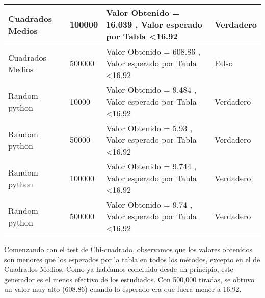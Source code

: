 \documentclass{article}
\begin{document}
\begin{table}[H]
\begin{tabular}{|l|l|l|l|}
\rowcolor[HTML]{FFFFFF} 
Cuadrados Medios                                                                        & 100000                                              & Valor Obtenido = 16.039  , Valor esperado por Tabla \textless 16.92                               & \cellcolor[HTML]{00FF00}Verdadero          \\ \hline
\rowcolor[HTML]{EFEFEF} 
Cuadrados Medios                                                                        & 500000                                              & Valor Obtenido = 608.86  , Valor esperado por Tabla \textless 16.92                               & \cellcolor[HTML]{FF0000}Falso              \\ \hline
\rowcolor[HTML]{FFFFFF} 
Random python                                                                           & 10000                                               & Valor Obtenido = 9.484  , Valor esperado por Tabla \textless 16.92                                & \cellcolor[HTML]{00FF00}Verdadero          \\ \hline
\rowcolor[HTML]{EFEFEF} 
Random python                                                                           & 50000                                               & Valor Obtenido = 5.93  , Valor esperado por Tabla \textless 16.92                                 & \cellcolor[HTML]{00FF00}Verdadero          \\ \hline
\rowcolor[HTML]{FFFFFF} 
Random python                                                                           & 100000                                              & Valor Obtenido = 9.744  , Valor esperado por Tabla \textless 16.92                                & \cellcolor[HTML]{00FF00}Verdadero          \\ \hline
\rowcolor[HTML]{EFEFEF} 
Random python                                                                           & 500000                                              & Valor Obtenido = 9.74  , Valor esperado por Tabla \textless 16.92                                 & \cellcolor[HTML]{00FF00}Verdadero          \\ \hline
\end{tabular}
\end{table}

Comenzando con el test de Chi-cuadrado, observamos que los valores obtenidos son menores que los esperados por la tabla en todos los métodos, excepto en el de Cuadrados Medios. Como ya habíamos concluido desde un principio, este generador es el menos efectivo de los estudiados. Con 500,000 tiradas, se obtuvo un valor muy alto (608.86) cuando lo esperado era que fuera menor a 16.92.
\end{document}
